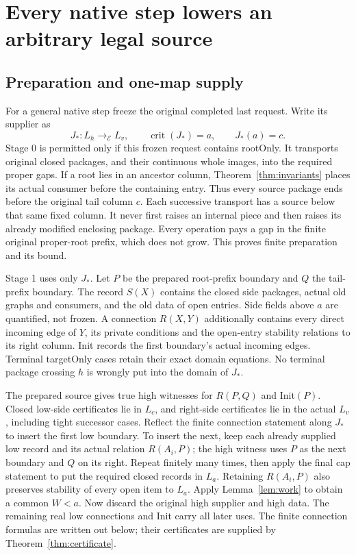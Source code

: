 \section{Every native step lowers an arbitrary legal source}\label{ch:descent}

\subsection{Preparation and one-map supply}
For a general native step freeze the original completed last request.
Write its supplier as
\[
 J_*:L_h\longrightarrow_{\mathcal E}L_v,
 \qquad \operatorname{crit}(J_*)=a,\qquad J_*(a)=c.
\]
Stage 0 is permitted only if this frozen request contains rootOnly.
It transports original closed packages, and their continuous whole
images, into the required proper gaps. If a root lies in an ancestor
column, Theorem~\ref{thm:invariants} places its actual consumer before
the containing entry. Thus every source package ends before the
original tail column $c$. Each successive transport has a source
below that same fixed column. It never first raises an internal
piece and then raises its already modified enclosing package.
Every operation pays a gap in the finite original proper-root prefix,
which does not grow. This proves finite preparation and its bound.

Stage 1 uses only $J_*$. Let $P$ be the prepared root-prefix boundary
and $Q$ the tail-prefix boundary. The record $S(X)$ contains the
closed side packages, actual old graphs and consumers, and the
old data of open entries. Side fields above $a$ are quantified,
not frozen. A connection $R(X,Y)$ additionally contains every direct
incoming edge of $Y$, its private conditions and the open-entry
stability relations to its right column. Init records the first
boundary's actual incoming edges. Terminal targetOnly cases retain
their exact domain equations. No terminal package crossing $h$ is
wrongly put into the domain of $J_*$.

The prepared source gives true high witnesses for $R(P,Q)$ and
Init$(P)$. Closed low-side certificates lie in $L_c$, and right-side
certificates lie in the actual $L_v$, including tight successor
cases. Reflect the finite connection statement along $J_*$ to
insert the first low boundary. To insert the next, keep each
already supplied low record and its actual relation $R(A_i,P)$;
the high witness uses $P$ as the next boundary and $Q$ on its right.
Repeat finitely many times, then apply the final cap statement to
put the required closed records in $L_a$. Retaining $R(A_i,P)$
also preserves stability of every open item to $L_a$. Apply
Lemma~\ref{lem:work} to obtain a common $W<a$. Now discard the
original high supplier and high data. The remaining real low
connections and Init carry all later uses. The finite connection formulas are written out below; their
certificates are supplied by Theorem~\ref{thm:certificate}.

